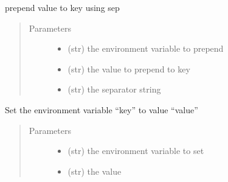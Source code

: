 \documentclass[a4paper,10pt,english]{sphinxmanual}
\begin{document}
\begin{fulllineitems}
\begin{fulllineitems}
\label{\detokenize{apidoc_src/src:src.fileEnviron.ContextFileEnviron.prepend_value}}
prepend value to key using sep
\begin{quote}\begin{description}
\item[{Parameters}] \leavevmode\begin{itemize}
\item {} 
 \textendash{} (str) the environment variable to prepend

\item {} 
 \textendash{} (str) the value to prepend to key

\item {} 
 \textendash{} (str) the separator string

\end{itemize}

\end{description}\end{quote}

\end{fulllineitems}


\begin{fulllineitems}
\label{\detokenize{apidoc_src/src:src.fileEnviron.ContextFileEnviron.set}}
Set the environment variable “key” to value “value”
\begin{quote}\begin{description}
\item[{Parameters}] \leavevmode\begin{itemize}
\item {} 
 \textendash{} (str) the environment variable to set

\item {} 
 \textendash{} (str) the value

\end{itemize}

\end{description}\end{quote}

\end{fulllineitems}


\end{fulllineitems}
\end{document}
